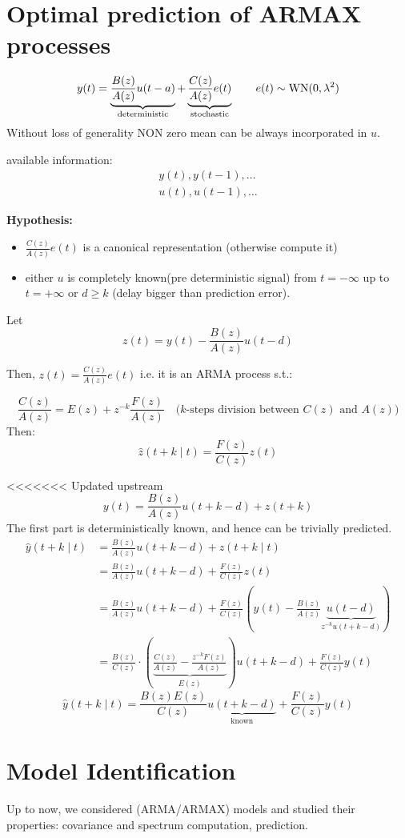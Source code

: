 \section{Optimal prediction of ARMAX processes}
\[
y(t)=\underbrace{\frac{B(z)}{A(z)} u(t-a)}_{\text{deterministic}}+
\underbrace{\frac{C(z)}{A(z)} e(t)}_{\text{stochastic}}\qquad e(t)\sim \operatorname{WN}(0,\lambda^2 )
\]
Without loss of generality NON zero mean can be always incorporated in $u$.

available information:
\begin{gather*}
	y(t),y(t-1),\ldots \\
	u(t),u(t-1),\ldots
\end{gather*}

\textbf{Hypothesis:}
\begin{itemize}
	\item $\frac{C(z)}{A(z)}e(t)$  is a canonical representation (otherwise compute it)
	\item either $u$ is completely known(pre deterministic signal) from $t=-\infty$ up to $t=+\infty$ or $d\geq k$ (delay bigger than prediction error).
\end{itemize}

Let 
$$z(t)=y(t)-\frac{B(z)}{A(z)} u(t-d)$$

Then, $z(t)=\frac{C(z)}{A(z)} e(t)$ i.e. it is an ARMA process s.t.:

$$\frac{C(z)}{A(z)}=E(z)+z^{-k} \frac{F(z)}{A(z)} \quad\text{($k$-steps division between $C(z)$ and $A(z)$)}
$$
Then:
$$
\hat{z}(t+k \mid t)=\frac{F(z)}{C(z)} z(t)
$$

<<<<<<< Updated upstream
$$y(t)=\frac{B(z)}{A(z)} u(t+k-d)+z(t+k)$$
The first part is deterministically 
known, and hence can 
be trivially predicted.
\begin{align*}
	\hat{y}(t+k \mid t)&=\frac{B(z)}{A(z)} u(t+k-d)+z(t+k \mid t) \\
	&=\frac{B(z)}{A(z)} u(t+k-d)+\frac{F(z)}{C(z)} z(t) \\
	& =\frac{B(z)}{A(z)} u(t+k-d)+\frac{F(z)}{C(z)}\left(y(t)-\frac{B(z)}{A(z)} \underbrace{u(t-d)}_{z^{-k}u(t+k-d)}\right) \\
	&=\frac{B(z)}{C(z)} \cdot\left(\underbrace{\frac{C(z)}{A(z)}-\frac{z^{-k} F(z)}{A(z)}}_{E(z)}\right) u(t+k-d)+\frac{F(z)}{C(z)} y(t)
\end{align*}
$$
\hat{y}(t+k \mid t) =\frac{B(z) E(z)}{C(z)} \underbrace{u(t+k-d)}_{\text{known}}+\frac{F(z)}{C(z)} y(t)
$$

\section{Model Identification}
Up to now, we considered (ARMA/ARMAX) models and studied their properties: covariance and spectrum computation, 
prediction.

